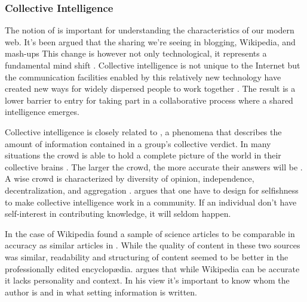 \subsubsection{Collective Intelligence}
The notion of  is important for understanding
the characteristics of our modern web. It's been argued that the sharing we're
seeing in blogging, Wikipedia, and mash-ups
This change is however not only technological, it represents a fundamental
mind shift \citep[]{kolbitsch06}.
Collective intelligence is not unique
to the Internet but the communication facilities enabled by this relatively
new technology have created new ways for widely dispersed people to work
together \citep{mitcenter08}. The result is a lower barrier to entry for
taking part in a collaborative process where a shared intelligence emerges.

Collective intelligence is closely related to
, a phenomena that describes the amount of information
contained in a group's collective verdict.
In many situations the crowd is able to hold a complete picture of the world
in their collective brains \citep[]{surowiecki04}. The larger the
crowd, the more accurate their answers will be%
.
A wise crowd is characterized by diversity of opinion, independence,
decentralization, and aggregation \citep[]{surowiecki04}.
\citet{powazek08} argues that one have to design for selfishness to make
collective intelligence work in a community. If an individual don't have
self-interest in contributing knowledge, it will seldom happen.

In the case of Wikipedia \citet{giles05} found a sample of science articles to
be comparable in accuracy as similar articles in
. While the quality of content in
these two sources was similar, readability and structuring of content seemed
to be better in the professionally edited encyclop\ae{}dia.
\citet{lanier06} argues that while Wikipedia can be accurate it lacks
personality and context. In his view it's important to know whom the author is
and in what setting information is written.

